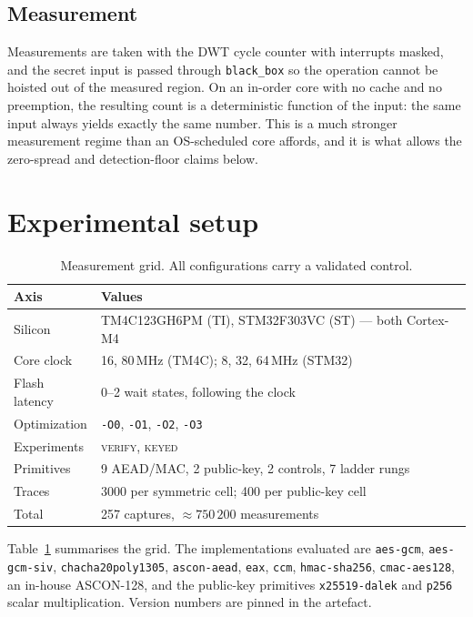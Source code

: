\documentclass[11pt,a4paper]{article}
\begin{document}
\subsection{Measurement}
Measurements are taken with the DWT cycle counter with interrupts masked, and
the secret input is passed through \texttt{black\_box} so the operation cannot
be hoisted out of the measured region. On an in-order core with no cache and no
preemption, the resulting count is a deterministic function of the input: the
same input always yields exactly the same number. This is a much stronger
measurement regime than an OS-scheduled core affords, and it is what allows the
zero-spread and detection-floor claims below.

\section{Experimental setup}

\begin{table}[t]
\centering
\caption{Measurement grid. All configurations carry a validated control.}
\label{tab:setup}
\begin{tabular}{ll}
\toprule
Axis & Values \\
\midrule
Silicon      & TM4C123GH6PM (TI), STM32F303VC (ST) --- both Cortex-M4 \\
Core clock   & 16, 80\,MHz (TM4C); 8, 32, 64\,MHz (STM32) \\
Flash latency& 0--2 wait states, following the clock \\
Optimization & \texttt{-O0}, \texttt{-O1}, \texttt{-O2}, \texttt{-O3} \\
Experiments  & \textsc{verify}, \textsc{keyed} \\
Primitives   & 9 AEAD/MAC, 2 public-key, 2 controls, 7 ladder rungs \\
Traces       & 3000 per symmetric cell; 400 per public-key cell \\
Total        & 257 captures, ${\approx}750\,200$ measurements \\
\bottomrule
\end{tabular}
\end{table}

Table~\ref{tab:setup} summarises the grid. The implementations evaluated are
\texttt{aes-gcm}, \texttt{aes-gcm-siv}, \texttt{chacha20poly1305},
\texttt{ascon-aead}, \texttt{eax}, \texttt{ccm}, \texttt{hmac-sha256},
\texttt{cmac-aes128}, an in-house ASCON-128, and the public-key primitives
\texttt{x25519-dalek} and \texttt{p256} scalar multiplication. Version numbers
are pinned in the artefact.
\end{document}
